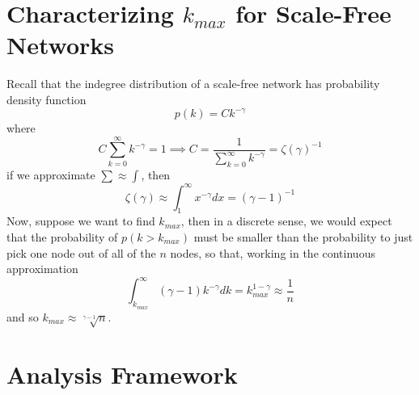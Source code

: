 \documentclass[11pt,a4paper]{article}
\newcommand{\pa}[1]{\left(#1\right)}
\begin{document}
\section*{Characterizing $k_{max}$ for Scale-Free Networks}
Recall that the indegree distribution of a scale-free network has probability 
density function
$$
p(k) = C k^{-\gamma}
$$
where 
$$
C \sum_{k=0}^\infty k^{-\gamma} = 1 \implies 
C = \frac{1}{\sum\limits_{k=0}^\infty k^{-\gamma}} = \zeta(\gamma)^{-1}
$$
if we approximate $\sum \approx \int$, then
$$
\zeta(\gamma) \approx \int_1^\infty x^{-\gamma} dx = \pa{\gamma-1}^{-1}
$$
Now, suppose we want to find $k_{max}$, then in a discrete sense, we would 
expect that the probability of $p(k > k_{max})$ must be smaller than the 
probability to just pick one node out of all of the $n$ nodes, so that, 
working in the continuous approximation
$$
\int_{k_{max}}^\infty (\gamma -1)k^{-\gamma} dk = k_{max}^{1-\gamma} \approx 
\frac{1}{n}
$$
and so $k_{max} \approx \sqrt[\gamma - 1]{n}$. \cite{CLASS}

\section*{Analysis Framework}


\medskip

\printbibliography[title={References}]
\end{document}
